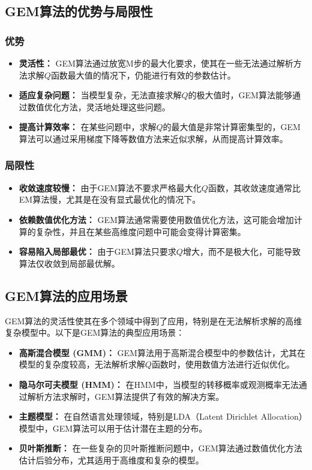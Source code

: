 \documentclass[a4paper,12pt]{ctexart} %
\begin{document}
\subsection{GEM算法的优势与局限性}

\subsubsection{优势}
\begin{itemize}
    \item \textbf{灵活性：} GEM算法通过放宽M步的最大化要求，使其在一些无法通过解析方法求解$Q$函数最大值的情况下，仍能进行有效的参数估计。
    \item \textbf{适应复杂问题：} 当模型复杂，无法直接求解$Q$的极大值时，GEM算法能够通过数值优化方法，灵活地处理这些问题。
    \item \textbf{提高计算效率：} 在某些问题中，求解$Q$的最大值是非常计算密集型的，GEM算法可以通过采用梯度下降等数值方法来近似求解，从而提高计算效率。
\end{itemize}

\subsubsection{局限性}
\begin{itemize}
    \item \textbf{收敛速度较慢：} 由于GEM算法不要求严格最大化$Q$函数，其收敛速度通常比EM算法慢，尤其是在没有显式最优化的情况下。
    \item \textbf{依赖数值优化方法：} GEM算法通常需要使用数值优化方法，这可能会增加计算的复杂性，并且在某些高维度问题中可能会变得计算密集。
    \item \textbf{容易陷入局部最优：} 由于GEM算法只要求$Q$增大，而不是极大化，可能导致算法仅收敛到局部最优解。
\end{itemize}

\subsection{GEM算法的应用场景}

GEM算法的灵活性使其在多个领域中得到了应用，特别是在无法解析求解的高维复杂模型中。以下是GEM算法的典型应用场景：

\begin{itemize}
    \item \textbf{高斯混合模型 (GMM)：} GEM算法用于高斯混合模型中的参数估计，尤其在模型的复杂度较高，无法解析求解$Q$函数时，使用数值方法进行近似优化。
    \item \textbf{隐马尔可夫模型 (HMM)：} 在HMM中，当模型的转移概率或观测概率无法通过解析方法求解时，GEM算法提供了有效的解决方案。
    \item \textbf{主题模型：} 在自然语言处理领域，特别是LDA（Latent Dirichlet Allocation）模型中，GEM算法可以用于估计潜在主题的分布。
    \item \textbf{贝叶斯推断：} 在一些复杂的贝叶斯推断问题中，GEM算法通过数值优化方法估计后验分布，尤其适用于高维度和复杂的模型。
\end{itemize}
\end{document}
